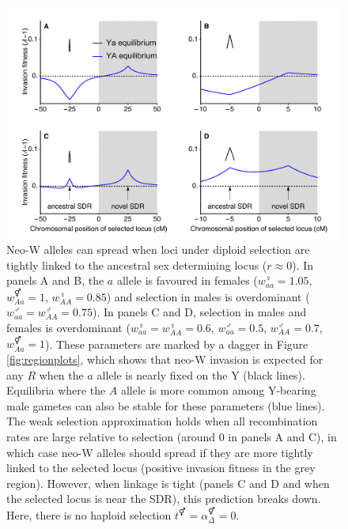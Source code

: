 \documentclass[12pt]{article}
\begin{document}
\begin{figure}[!h]
\centering
\centerline{\includegraphics[width=\linewidth]{PositionPlot_Overdominance_Mike}}
\caption{
Neo-W alleles can spread when loci under diploid selection are tightly linked to the ancestral sex determining locus ($r\approx0$). 
In panels A and B, the $a$ allele is favoured in females ($w_{aa}^\female=1.05$, $w_{Aa}^\Hermaphrodite=1$, $w_{AA}^\female=0.85$) and selection in males is overdominant ($w_{aa}^\male=w_{AA}^\male=0.75$).
In panels C and D, selection in males and females is overdominant ($w_{aa}^\female=w_{AA}^\female=0.6$, $w_{aa}^\male=0.5$, $w_{AA}^\male=0.7$, $w_{Aa}^\Hermaphrodite=1$). 
These parameters are marked by a dagger in Figure \ref{fig:regionplots}, which shows that neo-W invasion is expected for any $R$ when the $a$ allele is nearly fixed on the Y (black lines). 
Equilibria where the $A$ allele is more common among Y-bearing male gametes can also be stable for these parameters (blue lines). 
The weak selection approximation holds when all recombination rates are large relative to selection (around 0 in panels A and C), in which case neo-W alleles should spread if they are more tightly linked to the selected locus (positive invasion fitness in the grey region). 
However, when linkage is tight (panels C and D and when the selected locus is near the SDR), this prediction breaks down. 
Here, there is no haploid selection $t^\Hermaphrodite = \alpha^\Hermaphrodite_\Delta = 0$.
}
\label{fig:positionOverdominance}
\end{figure}
\end{document}
